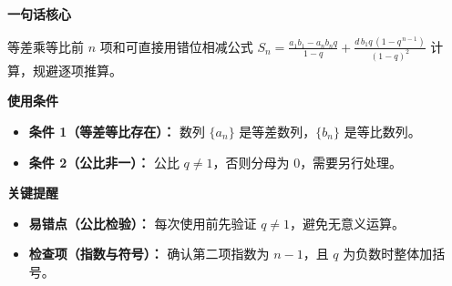 \begin{summarybox}
	\textbf{\textcolor{CSummary}{一句话核心}}

	等差乘等比前 $n$ 项和可直接用错位相减公式 $S_n = \frac{a_1 b_1 - a_n b_n q}{1-q} + \frac{d\,b_1 q\,(1-q^{\,n-1})}{(1-q)^2}$ 计算，规避逐项推算。

	\medskip
	\textbf{\textcolor{CSummary}{使用条件}}
	\begin{itemize}[leftmargin=*, itemsep=0.5em, topsep=0.4em]
		\item \textbf{条件 1（等差等比存在）：} 数列 $\{a_n\}$ 是等差数列，$\{b_n\}$ 是等比数列。
		\item \textbf{条件 2（公比非一）：} 公比 $q \neq 1$，否则分母为 $0$，需要另行处理。
	\end{itemize}

	\medskip
	\textbf{\textcolor{CSummary}{关键提醒}}
	\begin{itemize}[leftmargin=*, itemsep=0.5em, topsep=0.4em]
		\item \textbf{易错点（公比检验）：} 每次使用前先验证 $q \neq 1$，避免无意义运算。
		\item \textbf{检查项（指数与符号）：} 确认第二项指数为 $n-1$，且 $q$ 为负数时整体加括号。
	\end{itemize}
\end{summarybox}
